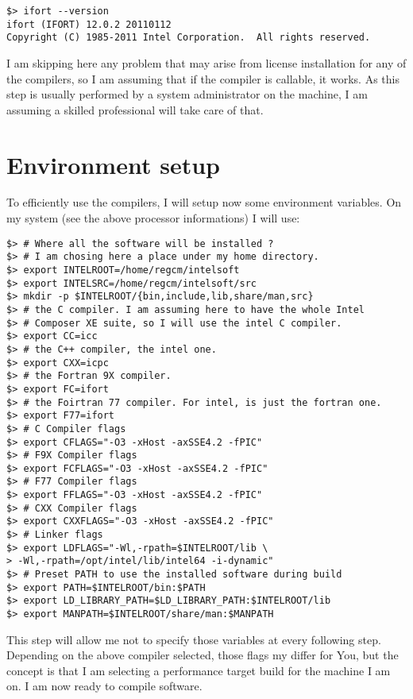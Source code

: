\begin{Verbatim}
$> ifort --version
ifort (IFORT) 12.0.2 20110112
Copyright (C) 1985-2011 Intel Corporation.  All rights reserved.

\end{Verbatim}

I am skipping here any problem that may arise from license installation for any
of the compilers, so I am assuming that if the compiler is callable, it works.
As this step is usually performed by a system administrator on the machine,
I am assuming a skilled professional will take care of that.

\section{Environment setup}

To efficiently use the compilers, I will setup now some environment variables.
On my system (see the above processor informations) I will use:

\begin{Verbatim}
$> # Where all the software will be installed ?
$> # I am chosing here a place under my home directory.
$> export INTELROOT=/home/regcm/intelsoft
$> export INTELSRC=/home/regcm/intelsoft/src
$> mkdir -p $INTELROOT/{bin,include,lib,share/man,src}
$> # the C compiler. I am assuming here to have the whole Intel
$> # Composer XE suite, so I will use the intel C compiler.
$> export CC=icc
$> # the C++ compiler, the intel one.
$> export CXX=icpc
$> # the Fortran 9X compiler.
$> export FC=ifort
$> # the Foirtran 77 compiler. For intel, is just the fortran one.
$> export F77=ifort
$> # C Compiler flags
$> export CFLAGS="-O3 -xHost -axSSE4.2 -fPIC"
$> # F9X Compiler flags
$> export FCFLAGS="-O3 -xHost -axSSE4.2 -fPIC"
$> # F77 Compiler flags
$> export FFLAGS="-O3 -xHost -axSSE4.2 -fPIC"
$> # CXX Compiler flags
$> export CXXFLAGS="-O3 -xHost -axSSE4.2 -fPIC"
$> # Linker flags
$> export LDFLAGS="-Wl,-rpath=$INTELROOT/lib \
> -Wl,-rpath=/opt/intel/lib/intel64 -i-dynamic"
$> # Preset PATH to use the installed software during build
$> export PATH=$INTELROOT/bin:$PATH
$> export LD_LIBRARY_PATH=$LD_LIBRARY_PATH:$INTELROOT/lib
$> export MANPATH=$INTELROOT/share/man:$MANPATH
\end{Verbatim}

This step will allow me not to specify those variables at every following step.
Depending on the above compiler selected, those flags my differ for You, but the
concept is that I am selecting a performance target build for the machine I am
on. I am now ready to compile software.

